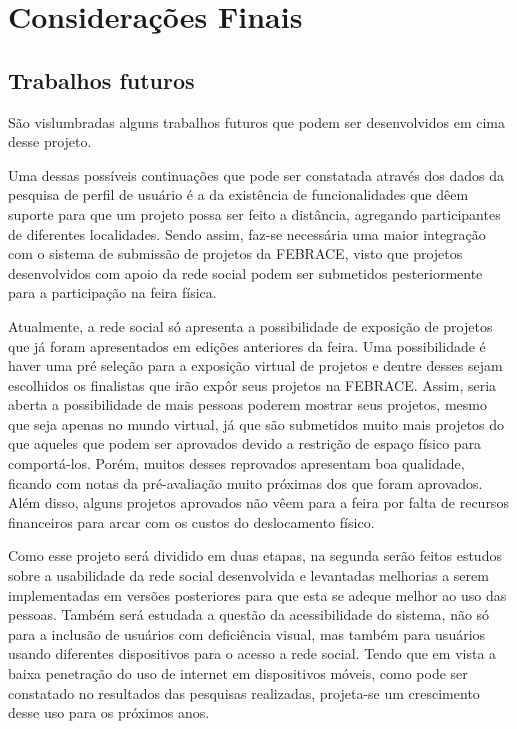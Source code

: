 
\chapter{Considerações Finais}

\section{Trabalhos futuros}

São vislumbradas alguns trabalhos futuros que podem ser desenvolvidos em cima desse projeto. 

Uma dessas possíveis continuações que pode ser constatada através dos dados da pesquisa de perfil de usuário é a da existência de funcionalidades que dêem suporte para que um projeto possa ser feito a distância, agregando participantes de diferentes localidades. Sendo assim, faz-se necessária uma maior integração com o sistema de submissão de projetos da FEBRACE, visto que projetos desenvolvidos com apoio da rede social podem ser submetidos pesteriormente para a participação na feira física. 

Atualmente, a rede social só apresenta a possibilidade de exposição de projetos que já foram apresentados em edições anteriores da feira. Uma possibilidade é haver uma pré seleção para a exposição virtual de projetos e dentre desses sejam escolhidos os finalistas que irão expôr seus projetos na FEBRACE. Assim, seria aberta a possibilidade de mais pessoas poderem mostrar seus projetos, mesmo que seja apenas no mundo virtual, já que são submetidos muito mais projetos do que aqueles que podem ser aprovados devido a restrição de espaço físico para comportá-los. Porém, muitos desses reprovados apresentam boa qualidade, ficando com notas da pré-avaliação muito próximas dos que foram aprovados. Além disso, alguns projetos aprovados não vêem para a feira por falta de recursos financeiros para arcar com os custos do deslocamento físico.

Como esse projeto será dividido em duas etapas, na segunda serão feitos estudos sobre a usabilidade da rede social desenvolvida e levantadas melhorias a serem implementadas em versões posteriores para que esta se adeque melhor ao uso das pessoas. Também será estudada a questão da acessibilidade do sistema, não só para a inclusão de usuários com deficiência visual, mas também para usuários usando diferentes dispositivos para o acesso a rede social. Tendo que em vista a baixa penetração do uso de internet em dispositivos móveis, como pode ser constatado no resultados das pesquisas realizadas, projeta-se um crescimento desse uso para os próximos anos.


